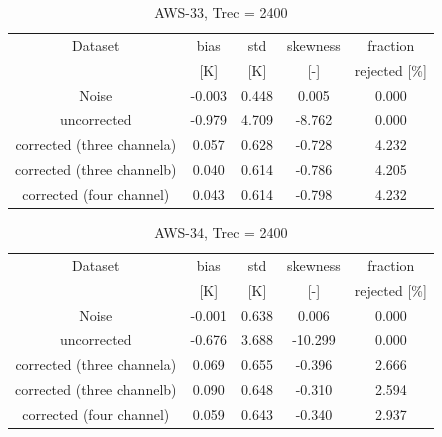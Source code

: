 \documentclass[12pt]{article}
\begin{document}
\begin{table}[!p]
	\centering
	\begin{tabular}[b]{c|c|c|c|c}
		Dataset  		  &   bias &   std &   skewness & fraction  \\
		&   [K]  &   [K] & [-] & rejected [\%]\\
		\hline
 Noise                     & -0.003 & 0.448 &              0.005 &      0.000 \\
uncorrected                & -0.979 & 4.709 &             -8.762 &      0.000 \\
corrected (three channela) &  0.057 & 0.628 &             -0.728 &      4.232 \\
corrected (three channelb) &  0.040 & 0.614 &             -0.786 &      4.205 \\
corrected (four channel)   &  0.043 & 0.614 &             -0.798 &      4.232 \\
		\hline
	\end{tabular}
	\caption{ AWS-33, Trec = 2400  }
	\label{tab:qrnn:C36}
\end{table}

\begin{table}[!p]
	\centering
	\begin{tabular}[b]{c|c|c|c|c}
		Dataset  		  &   bias &   std &   skewness & fraction  \\
		&   [K]  &   [K] & [-] & rejected [\%]\\
		\hline
 Noise                      & -0.001 & 0.638 &              0.006 &      0.000 \\
uncorrected                 & -0.676 & 3.688 &            -10.299 &      0.000 \\
 corrected (three channela) &  0.069 & 0.655 &             -0.396 &      2.666 \\
corrected (three channelb)  &  0.090 & 0.648 &             -0.310 &      2.594 \\
corrected (four channel)    &  0.059 & 0.643 &             -0.340 &      2.937 \\
		\hline
	\end{tabular}
	\caption{ AWS-34, Trec = 2400 }
	\label{tab:qrnn:C36}
\end{table}
\end{document}
